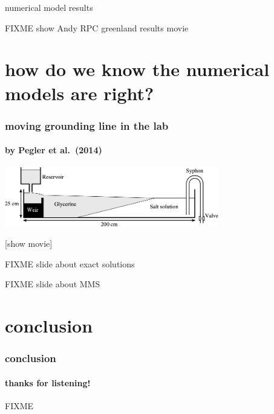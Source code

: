 \documentclass[hide notes,intlimits]{beamer}
\begin{document}
\begin{frame}{numerical model results}

FIXME show Andy RPC greenland results movie
\end{frame}


\section[on being right]{how do we know the numerical models are right?}

\begin{frame}
  \frametitle{moving grounding line in the lab}
  \framesubtitle{by Pegler et al.~(2014)}

\begin{center}

\includegraphics[width=0.7\textwidth]{pegler2014-grounding-line-schematic}

\vspace{1.0in}
[show movie]
\end{center}
\end{frame}


\begin{frame}{FIXME slide about exact solutions}
\end{frame}


\begin{frame}{FIXME slide about MMS}
\end{frame}



\section*{conclusion}

\begin{frame}
  \frametitle{conclusion}
  \framesubtitle{thanks for listening!}

\begin{center}
FIXME
\end{center}

\end{frame}
\end{document}
